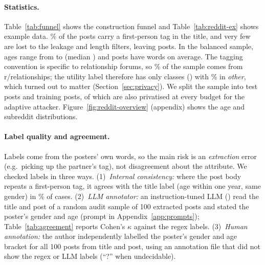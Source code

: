 \documentclass[11pt]{article}
\begin{document}
\begin{table}[t]
\centering
\small

\caption{Construction funnel of the Reddit self-disclosure dataset.}
\label{tab:funnel}
\end{table}

\begin{table}[t]
\centering
\small

\caption{Snippets from the constructed dataset after cleaning (one per gender $\times$ age-bracket cell). The tags were removed from the text; the bold labels were mined from the title.}
\label{tab:reddit-ex}
\end{table}

\paragraph{Statistics.} Table~\ref{tab:funnel} shows the construction funnel and Table~\ref{tab:reddit-ex} shows example data. \PctTagged\% of the \FunParsed{} posts carry a first-person tag in the title, and very few are lost to the leakage and length filters, leaving \FunDedup{} posts. In the balanced sample, ages range from \AgeMin{} to \AgeMax{} (median \AgeMedian) and posts have \RedditLen{} words on average. The tagging convention is specific to relationship forums, so \PctRelationships\% of the sample comes from r/relationships; the utility label therefore has only \NSubLabels{} classes (\SubLabels) with \PctOther\% in \emph{other}, which turned out to matter (Section~\ref{sec:privacy}). We split the sample into \NTest{} test posts and \NTrain{} training posts, of which \NAdapt{} are also privatised at every budget for the adaptive attacker. Figure~\ref{fig:reddit-overview} (appendix) shows the age and subreddit distributions.

\paragraph{Label quality and agreement.} Labels come from the posters' own words, so the main risk is an \emph{extraction} error (e.g.\ picking up the partner's tag), not disagreement about the attribute. We checked labels in three ways. (1)~\emph{Internal consistency:} where the post body repeats a first-person tag, it agrees with the title label (age within one year, same gender) in \AgreeRate\% of \AgreeN{} cases. (2)~\emph{LLM annotator:} an instruction-tuned LLM (\JudgeModel) read the title and post of a random audit sample of 100 extracted posts and stated the poster's gender and age (prompt in Appendix~\ref{app:prompts}); Table~\ref{tab:agreement} reports Cohen's $\kappa$ \citep{cohen1960coefficient} against the regex labels. (3)~\emph{Human annotation:} the author independently labelled the poster's gender and age bracket for all 100 posts from title and post, using an annotation file that did not show the regex or LLM labels (``?'' when undecidable).
\end{document}
